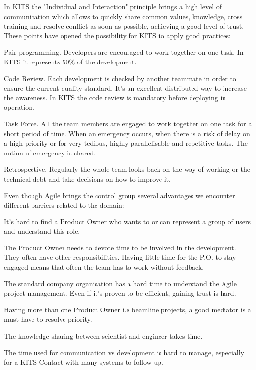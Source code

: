 \documentclass[a4paper,
              ]{jacow}
\begin{document}
In KITS the "Individual and Interaction" principle brings a high level of communication which allows to quickly share common values, knowledge, cross training and resolve conflict as soon as possible, achieving a good level of trust. These points have opened the possibility for KITS to apply good practices:
\begin{Itemize}
      \item Pair programming. 
      Developers are encouraged to work together on one task. In KITS it represents 50\% of the development.
      \item Code Review. 
      Each development is checked by another teammate in order to ensure the current quality standard. It's an excellent distributed way to increase the awareness. In KITS the code review is mandatory before deploying in operation.
      \item Task Force. 
      All the team members are engaged to work together on one task for a short period of time. When an emergency occurs, when there is a risk of delay on a high priority or for very tedious, highly parallelisable and repetitive tasks.
      The notion of emergency is shared.
      \item Retrospective.
      Regularly the whole team looks back on the way of working or the technical debt and take decisions on how to improve it. 
\end{Itemize}

Even though Agile brings the control group several advantages we encounter different barriers related to the domain:
\begin{Itemize}
      \item It's hard to find a Product Owner who wants to or can represent a group of users and understand this role.
      \item The Product Owner needs to devote time to be involved in the development. They often have other responsibilities. Having little time for the P.O. to stay engaged means that often the team has to work without feedback.
      \item The standard company organisation has a hard time to understand the Agile project management. Even if it's proven to be efficient, gaining trust is hard.
      \item Having more than one Product Owner i.e beamline projects, a good mediator is a must-have to resolve priority. 
      \item The knowledge sharing between scientist and engineer takes time.
      \item The time used for communication vs development is hard to manage, especially for a KITS Contact with many systems to follow up.
\end{Itemize}
\end{document}
